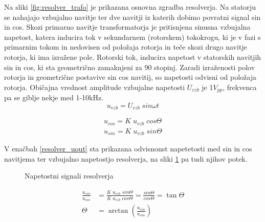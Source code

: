 \documentclass[a4paper,twoside,openright,12pt]{book}
\begin{document}
Na sliki \ref{fig:resolver_trafo} je prikazana osnovna zgradba resolverja. Na statorju se nahajajo vzbujalno navitje ter dve navitji iz katerih dobimo povratni signal sin in cos. Skozi primarno navitje transformatorja je pritisnjena sinusna vzbujalna napetost, katera inducira tok v sekundarnem (rotorskem) tokokrogu, ki je v fazi s primarnim tokom in nedovisen od položaja rotorja in teče skozi drugo navitje rotorja, ki ima izražene pole. Rotorski tok, inducira napetost  v statorskih navitjih sin in cos, ki sta geometrično zamaknjeni za 90 stopinj. Zaradi izraženosti polov rotorja in geometrične postavive sin cos navitij, so napetosti odvisni od položaja rotorja. Običajna vrednost amplitude vzbujalne napetosti $U_{vzb}$ je 1$V_{pp}$, frekvenca pa se giblje nekje med 1-10kHz.
\begin{equation} \label{resolver_uvzb}
u_{vzb} = U_{vzb}\;sin\omega t
\end{equation}

\begin{equation} \label{resolver_uout}
\begin{aligned}
	u_{cos} = K\;u_{vzb}\;cos\Theta \\ 
	u_{sin} = K\;u_{vzb}\;sin\Theta 
\end{aligned}
\end{equation}


V enačbah \ref{resolver_uout} sta prikazana odvisnonst napetetosti med sin in cos navitjema ter vzbujalno napetostjo resolverja,  na sliki \ref{fig:resolver_signali} pa tudi njihov potek.

\begin{figure}[h]
	\begin{center}	
		\pgfplotsset{width=10cm,compat=1.13}	
		  \caption{Napetostni signali resolverja}
		  \label{fig:resolver_signali}
	\end{center}		  
\end{figure}


\begin{equation} \label{resolver_theta}
\begin{aligned}
\frac{u_{sin}}{u_{cos}} & = \frac{K\;u_{vzb}\;sin\Theta }{K\;u_{vzb}\;cos\Theta } =\frac{sin\Theta}{cos\Theta} =\tan\Theta \\[10pt]
\Theta & = \arctan(\frac{u_{sin}}{u_{cos}})
\end{aligned}
\end{equation}
\end{document}

